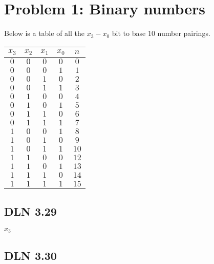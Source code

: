 \documentclass[titlepage]{article}
\begin{document}
 \maketitle

\section{Problem 1: Binary numbers}

Below is a table of all the \(x_3-x_0\) bit to base 10 number pairings.

\begin{center}
\begin{tabular}{c c c c|c}
\textbf{$x_3$} & \textbf{$x_2$} & \textbf{$x_1$} & \textbf{$x_0$} & \textbf{$n$} \\ \hline
\(0\) & \(0\) & \(0\) & \(0\) & \(0\)\\
\(0\) & \(0\) & \(0\) & \(1\) & \(1\)\\
\(0\) & \(0\) & \(1\) & \(0\) & \(2\)\\
\(0\) & \(0\) & \(1\) & \(1\) & \(3\)\\
\(0\) & \(1\) & \(0\) & \(0\) & \(4\)\\
\(0\) & \(1\) & \(0\) & \(1\) & \(5\)\\
\(0\) & \(1\) & \(1\) & \(0\) & \(6\)\\
\(0\) & \(1\) & \(1\) & \(1\) & \(7\)\\
\(1\) & \(0\) & \(0\) & \(1\) & \(8\)\\
\(1\) & \(0\) & \(1\) & \(0\) & \(9\)\\
\(1\) & \(0\) & \(1\) & \(1\) & \(10\)\\
\(1\) & \(1\) & \(0\) & \(0\) & \(12\)\\
\(1\) & \(1\) & \(0\) & \(1\) & \(13\)\\
\(1\) & \(1\) & \(1\) & \(0\) & \(14\)\\
\(1\) & \(1\) & \(1\) & \(1\) & \(15\)\\

\end{tabular}
\end{center}

\subsection{DLN 3.29}  %

$x_3$

\subsection{DLN 3.30} 
\end{document}
